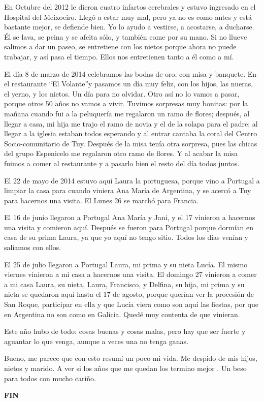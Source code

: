 \documentclass[12pt,a5paper]{book}
\begin{document}
En Octubre del 2012 le dieron cuatro infartos cerebrales y estuvo ingresado en el Hospital del Meixoeiro. Llegó a estar muy mal, pero ya no es como antes y está bastante mejor, se defiende bien. Yo lo ayudo a vestirse, a acostarse, a ducharse. Él se lava, se peina y se afeita sólo, y también come por su mano. Si no llueve salimos a dar un paseo, se entretiene con los nietos porque ahora no puede trabajar, y así pasa el tiempo. Ellos nos entretienen tanto a él como a mí.

El día 8 de marzo de 2014 celebramos las bodas de oro, con misa y banquete. En el restaurante “El Volante”y pasamos un día muy feliz, con los hijos, las nueras, el yerno, y los nietos. Un día para no olvidar. Otro así no lo vamos a pasar, porque otros 50 años no vamos a vivir. Tuvimos sorpresas muy bonitas: por la mañana cuando fui a la peluquería me regalaron un ramo de flores; después, al llegar a casa, mi hija me trajo el ramo de novia y el de la solapa para el padre; al llegar a la iglesia estaban todos esperando y al entrar cantaba la coral del Centro Socio-comunitario de Tuy. Después de la misa tenía otra sorpresa, pues las chicas del grupo Espenicelo me regalaron otro ramo de flores. Y al acabar la misa fuimos a comer al restaurante y a pasarlo bien el resto del día todos juntos.

El 22 de mayo de 2014 estuvo aquí Laura la portuguesa, porque vino a Portugal a limpiar la casa para cuando viniera Ana María de Argentina, y se acercó a Tuy para hacernos una visita. El Lunes 26 se marchó para Francia.

El 16 de junio llegaron a Portugal Ana María y Jani, y el 17 vinieron a hacernos una visita y comieron aquí. Después se fueron para Portugal porque dormían en casa de su prima Laura, ya que yo aquí no tengo sitio. Todos los días venían y salíamos con ellos.

El 25 de julio llegaron a Portugal Laura, mi prima y su nieta Lucía. El mismo viernes vinieron a mi casa a hacernos una visita. El domingo 27 vinieron a comer a mi casa Laura, su nieta, Laura, Francisco, y Delfina, su hija, mi prima y su nieta se quedaron aquí hasta el 17 de agosto, porque querían ver la procesión de San Roque, participar en ella y que Lucía viera como son aquí las fiestas, por que en Argentina no son como en Galicia. Quedé muy contenta de que vinieran.

Este año hubo de todo: cosas buenas y cosas malas, pero hay que ser fuerte y aguantar lo que venga, aunque a veces una no tenga ganas.

Bueno, me parece que con esto resumí un poco mi vida. Me despido de mis hijos, nietos y marido. A ver si los años que me quedan los termino mejor . Un beso para todos con mucho cariño.



\begin{center}
\textbf{FIN}
\end{center}
\end{document}
